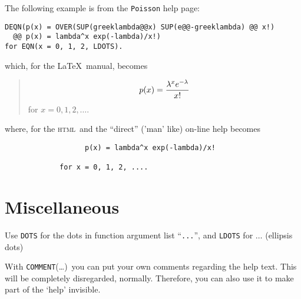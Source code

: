 \documentclass[a4paper,11pt]{article}
\newenvironment{display}[0]%
 {\begin{list}{}{\setlength{\leftmargin}{30pt}}\item}%
 {\end{list}}
\newcommand{\HTML}{\textsc{html}}
\begin{document}
\noindent The following example is from the \texttt{Poisson} help page:
\begin{display}
\begin{verbatim}
DEQN(p(x) = OVER(SUP(greeklambda@@x) SUP(e@@-greeklambda) @@ x!)
  @@ p(x) = lambda^x exp(-lambda)/x!)
for EQN(x = 0, 1, 2, LDOTS).
\end{verbatim}
\end{display}
which, for the \LaTeX\ manual, becomes
\begin{quote}
\[ p(x) = {{{{\lambda}^{x}} {{e}^{-\lambda}}} \over {x!}}
 \]
for $ x = 0, 1, 2, \ldots $.
\end{quote}
where, for the \HTML\ and  the ``direct'' ('man' like) on-line help becomes
\begin{verbatim}
                   p(x) = lambda^x exp(-lambda)/x!
        
             for x = 0, 1, 2, ....
\end{verbatim}
        

\section{Miscellaneous}
Use \texttt{DOTS} for the dots in function argument list ``\texttt{...}'',
and \texttt{LDOTS} for $\ldots$ (ellipsis dots)

With \texttt{COMMENT}(\dots)\ you can put your own comments regarding the
help text. This will be completely disregarded, normally. Therefore, you
can also use it to make part of the `help' invisible.
\end{document}
